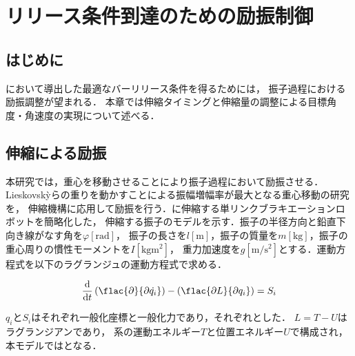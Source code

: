 \chapter[リリース条件到達のための励振制御]%
{リリース条件到達のための励振制御}
        \section{はじめに}

        において導出した最適なバーリリース条件を得るためには，
        振子過程における励振調整が望まれる．
        本章では伸縮タイミングと伸縮量の調整による目標角度・角速度の実現について述べる．
          
        \section{伸縮による励振}

          本研究では，重心を移動させることにより振子過程において励振させる．
          Lieskovsk{\`y}らの重りを動かすことによる振幅増幅率が最大となる重心移動の研究\cite{lieskovsky2023optimal}を，
          伸縮機構に応用して励振を行う．\figref{}に伸縮する単リンクブラキエーションロボットを簡略化した，
          伸縮する振子のモデルを示す．振子の半径方向と鉛直下向き線がなす角を$\varphi [\mathrm{rad}]$，
          振子の長さを$l [\mathrm{m}]$，振子の質量を$m [\mathrm{kg}]$，振子の重心周りの慣性モーメントを$I [\mathrm{kg}\mathrm{m}^2]$，
          重力加速度を$g [\mathrm{m}/\mathrm{s}^2]$とする．運動方程式を以下のラグランジュの運動方程式で求める．

          \begin{eqnarray}
            \equlabel{Lagrange}
            \frac{\mathrm{d}}{\mathrm{d}t}\left(\flac{\partial}{{\partial}\dot{q_i}}\right)-\left(\flac{\partial L}{\partial q_i}\right)=S_i
            \end{eqnarray} 
          
          $q_i$と$S_i$はそれぞれ一般化座標と一般化力であり，それぞれとした．
          $L=T-U$はラグランジアンであり，
          系の運動エネルギー$T$と位置エネルギー$U$で構成され，本モデルではとなる．
          
